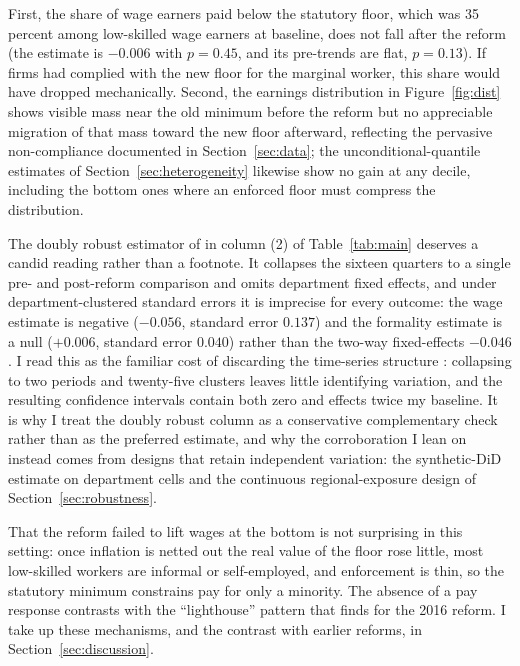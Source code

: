 First, the share of wage earners paid below the statutory floor, which was 35 percent
among low-skilled wage earners at baseline, does not fall after the reform (the estimate is
$-0.006$ with $p=0.45$, and its pre-trends are flat, $p=0.13$). If firms had complied
with the new floor for the marginal worker, this share would have dropped mechanically.
Second, the earnings distribution in Figure~\ref{fig:dist} shows visible mass near the
old minimum before the reform but no appreciable migration of that mass toward the new
floor afterward, reflecting the pervasive non-compliance documented in
Section~\ref{sec:data}; the unconditional-quantile estimates of
Section~\ref{sec:heterogeneity} likewise show no gain at any decile, including the
bottom ones where an enforced floor must compress the distribution.

The doubly robust estimator of \citet{santanna_zhao_2020} in column (2) of
Table~\ref{tab:main} deserves a candid reading rather than a footnote. It collapses
the sixteen quarters to a single pre- and post-reform comparison and omits department
fixed effects, and under department-clustered standard errors it is imprecise for
every outcome: the wage estimate is negative ($-0.056$, standard error $0.137$) and
the formality estimate is a null ($+0.006$, standard error $0.040$) rather than the
two-way fixed-effects $-0.046$. I read this as the familiar cost of discarding the
time-series structure \citep{bertrand_2004}: collapsing to two periods and twenty-five
clusters leaves little identifying variation, and the resulting confidence intervals
contain both zero and effects twice my baseline. It is why I treat the doubly robust
column as a conservative complementary check rather than as the preferred estimate,
and why the corroboration I lean on instead comes from designs that retain
independent variation: the synthetic-DiD estimate on department cells and the
continuous regional-exposure design of Section~\ref{sec:robustness}.

That the reform failed to lift wages at the bottom is not surprising in this setting:
once inflation is netted out the real value of the floor rose little, most low-skilled
workers are informal or self-employed, and enforcement is thin, so the statutory minimum
constrains pay for only a minority. The absence of a pay response contrasts with the
``lighthouse'' pattern that \citet{jimenez_2023} finds for the 2016 reform. I take up
these mechanisms, and the contrast with earlier reforms, in Section~\ref{sec:discussion}.


